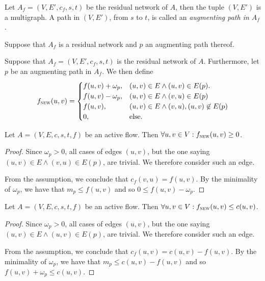 \documentclass{article}
\begin{document}
\begin{definition}
    Let $A_f = (V, E', c_f, s, t)$ be the residual network of $A$, then the tuple $(V, E')$ is a multigraph. A path in $(V, E')$, from $s$ to $t$, is called an \textit{augmenting path in $A_f$}.
\end{definition}

\begin{definition}
    Suppose that $A_f$ is a residual network and $p$ an augmenting path thereof.
\end{definition}

\begin{definition}
    Suppose that $A_f = (V, E', c_f, s, t)$ is the residual network of $A$. Furthermore, let $p$ be an augmenting path in $A_f$. We then define \begin{align*}
        f_{\textsc{new}}(u, v) = \begin{cases}
            f(u, v) + \omega_p, &(u, v) \in E \wedge (u, v) \in E(p).\\
            f(u, v) - \omega_p, &(u, v) \in E \wedge (v, u) \in E(p)\\
            f(u, v), &(u, v) \in E \wedge (v, u), (u, v) \not\in E(p)\\
            0, &\text{else}.
        \end{cases}
    \end{align*}
\end{definition}

\begin{lemma}
    Let $A=(V, E, c, s, t, f)$ be an active flow. Then $\forall u, v \in V : f_{\textsc{new}}(u, v) \geq 0$.
\end{lemma}
\begin{proof}
    Since $\omega_p > 0$, all cases of edges $(u, v)$, but the one saying $(u, v) \in E \wedge (v, u) \in E(p)$, are trivial. We therefore consider such an edge.

    From the assumption, we conclude that $c_f(v, u) = f(u, v)$. By the minimality of $\omega_p$, we have that $m_p \leq f(u, v)$ and so $0 \leq f(u, v) - \omega_p$.
\end{proof}

\begin{lemma}[No-overflow]
    Let $A=(V, E, c, s, t, f)$ be an active flow. Then $\forall u, v \in V : f_{\textsc{new}}(u, v) \leq c(u, v)$.
\end{lemma}
\begin{proof}
    Since $\omega_p > 0$, all cases of edges $(u, v)$, but the one saying $(u, v) \in E \wedge (u, v) \in E(p)$, are trivial. We therefore consider such an edge.

    From the assumption, we conclude that $c_f(u, v) = c(u, v) - f(u, v)$. By the minimality of $\omega_p$, we have that $m_p \leq c(u, v) - f(u, v)$ and so $f(u, v) + \omega_p \leq c(u, v)$.
\end{proof}
\end{document}
